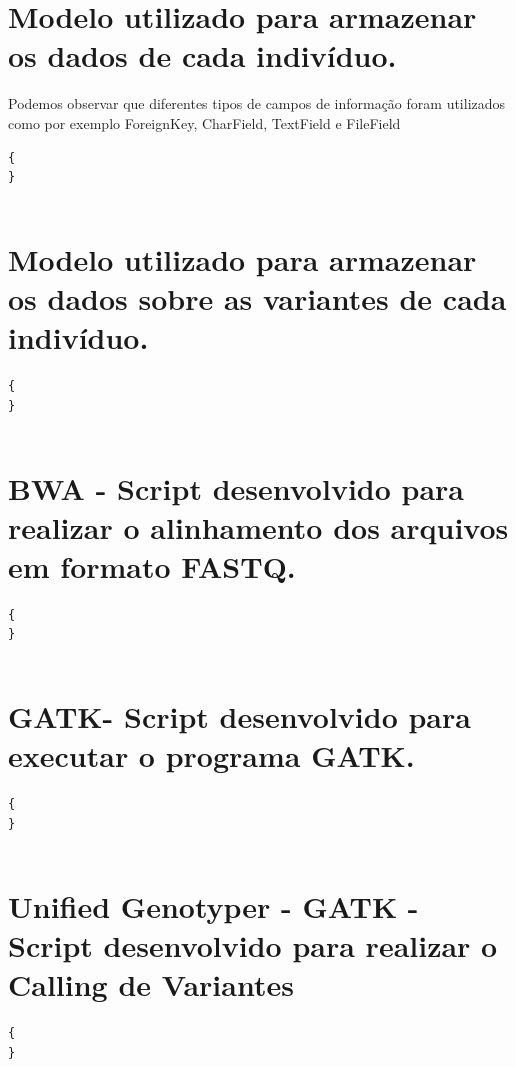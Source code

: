 \documentclass[
	12pt,				%
	openany,			%
	oneside,			%
	a4paper,			%
	english,			%
	brazil,				%
	]{abntex2}
\begin{document}
\begin{anexosenv}


\chapter{Modelo utilizado para armazenar os dados de cada indivíduo.}
Podemos observar que diferentes tipos de campos de informação foram utilizados como por exemplo ForeignKey, CharField, TextField e FileField

\begin{lstlisting}[caption={Modelo utilizado para armazenar os dados de cada indivíduo.},label={lst:modelo_individuo}]{
}
\end{lstlisting}
\inputminted[breaklines, fontsize=\small]{python}{code/models.py}


\chapter{Modelo utilizado para armazenar os dados sobre as variantes de cada indivíduo.}
\begin{lstlisting}[caption={Modelo utilizado para armazenar os dados sobre as variantes de cada indivíduo.},label={lst:modelo_variantes}]{
}
\end{lstlisting}
\inputminted[breaklines, fontsize=\small]{python}{code/variants_models.py}


\chapter{BWA - Script desenvolvido para realizar o alinhamento dos arquivos em formato FASTQ.}

\begin{lstlisting}[caption={BWA - Script desenvolvido para realizar o alinhamento dos arquivos em formato FASTQ.}]{
}
\end{lstlisting}
\inputminted[breaklines, fontsize=\small]{python}{scripts/bwa.py}

\chapter{GATK- Script desenvolvido para executar o programa GATK.}
\begin{lstlisting}[caption={GATK- Script desenvolvido para executar o programa GATK.}]{
}
\end{lstlisting}
\inputminted[breaklines, fontsize=\small]{python}{scripts/gatk.py}

\chapter{Unified Genotyper - GATK - Script desenvolvido para realizar o Calling de Variantes}
\begin{lstlisting}[caption={Unified Genotyper - GATK - Script desenvolvido para realizar o Calling de Variantes.}]{
}
\end{lstlisting}
\inputminted[breaklines, fontsize=\small]{python}{scripts/unifiedgenotyper.py}

\end{anexosenv}


\printindex
\end{document}
